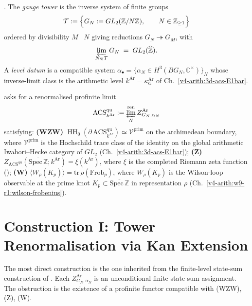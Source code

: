 \begin{definition}
\label{v4-arith:w10-a:def:tower}
\ClaimStatusDefinitional. The \emph{gauge tower} is the inverse
system of finite groups
\[
\mathcal{T}:=\Bigl\{
G_{N}:=GL_{2}(\mathbb Z/N\mathbb Z),\qquad N\in\mathbb Z_{\geq 1}
\Bigr\}
\]
ordered by divisibility \(M\mid N\) giving reductions \(G_{N}\twoheadrightarrow G_{M}\), with
\[
\varprojlim_{N\in\mathcal{T}}G_{N}\;=\;GL_{2}(\widehat{\mathbb{Z}}).
\]
A \emph{level datum} is a compatible system
\(\alpha_{\bullet}=\{\alpha_{N}\in H^{3}(BG_{N},\mathbb C^{\times})\}_{N}\)
whose inverse-limit class is the arithmetic level
\(k^{\mathrm{Ar}}=\kappa^{\mathrm{Ar}}_{\mathsf G}\) of
Ch.~\ref{v4-arith:3d-acs-E1bar}.
\end{definition}

\begin{remark}
\label{v4-arith:w10-a:rem:axioms}
 asks for a renormalised profinite
limit
\[
\mathrm{ACS}^{\mathrm{qu}}_{k^{\mathrm{Ar}}}
:=\varprojlim_{N}^{\mathrm{ren}}Z^{\mathrm{Ar}}_{G_{N},\alpha_{N}}
\]
satisfying:
\textbf{(WZW)}
\(\operatorname{HH}_{0}
(\partial\,\mathrm{ACS}^{\mathrm{qu}}_{k^{\mathrm{Ar}}})
\simeq\mathcal{V}^{\mathrm{prim}}\) on the archimedean boundary, where
\(\mathcal{V}^{\mathrm{prim}}\) is the Hochschild trace class of the
identity on the global arithmetic Iwahori--Hecke category of \(GL_{2}\)
(Ch.~\ref{v4-arith:3d-acs-E1bar});
\textbf{(Z)} \(Z_{\mathrm{ACS}^{\mathrm{qu}}}(\overline{\mathrm{Spec}\,\mathbb Z};k^{\mathrm{Ar}})=\xi(k^{\mathrm{Ar}})\),
where \(\xi\) is the completed Riemann zeta function
();
\textbf{(W)} \(\langle W_{\rho}(K_{p})\rangle=\mathrm{tr}\,\rho(\mathrm{Frob}_{p})\),
where \(W_{\rho}(K_{p})\) is the Wilson-loop observable at the prime knot \(K_{p}\subset\overline{\mathrm{Spec}\,\mathbb{Z}}\)
in representation \(\rho\) (Ch.~\ref{v4-arith:w9-r1:wilson-frobenius}).
\end{remark}

\section{Construction I: Tower Renormalisation via Kan Extension}
\label{v4-arith:w10-a:construction-I}

The most direct construction is the one inherited from the finite-level
state-sum construction of
. Each
\(Z^{\mathrm{Ar}}_{G_{N},\alpha_{N}}\) is an unconditional finite
state-sum assignment. The obstruction is the existence of a profinite
functor compatible with (WZW), (Z), (W).

